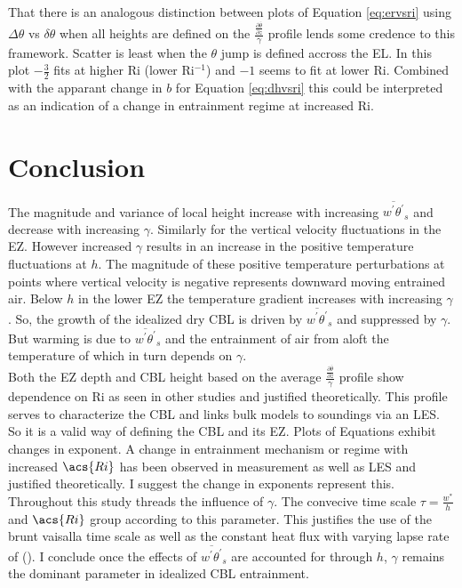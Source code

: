That there is an analogous distinction between plots of Equation \ref{eq:ervsri} using $\Delta \theta$ vs $\delta \theta$ when all heights are defined on the $\frac{\frac{\partial \overline{\theta}}{\partial z}}{\gamma}$ profile lends some credence to this framework.  Scatter is least when the $\theta$ jump is defined accross the \acs{EL}.  In this plot $-\frac{3}{2}$ fits at higher \acs{Ri} (lower \acs{Ri}$^{-1}$) and $-1$ seems to fit at lower \acs{Ri}.  Combined with the apparant change in $b$ for Equation \ref{eq:dhvsri} this could be interpreted as an indication of a change in entrainment regime at increased \acs{Ri}.\\ 

\section{Conclusion}

The magnitude and variance of local height increase with increasing $\overline{w^{'}\theta^{'}}_{s}$ and decrease with increasing $\gamma$.  Similarly for the vertical velocity fluctuations in the \acs{EZ}.  However increased $\gamma$ results in an increase in the positive temperature fluctuations at $h$. The magnitude of these positive temperature perturbations at points where vertical velocity is negative represents downward moving entrained air.  Below $h$ in the lower \acs{EZ} the temperature gradient increases with increasing $\gamma$. So, the growth of the idealized dry \acs{CBL} is driven by $\overline{w^{'}\theta^{'}}_{s}$ and suppressed by $\gamma$. But warming is due to $\overline{w^{'}\theta^{'}}_{s}$ and the entrainment of air from aloft the temperature of which in turn depends on $\gamma$.\\

Both the \acs{EZ} depth and \acs{CBL} height based on the average $\frac{\frac{\partial \overline{\theta}}{\partial z}}{\gamma}$ profile show dependence on \acs{Ri} as seen in other studies and justified theoretically.  This profile serves to characterize the \acs{CBL} and links bulk models to soundings via an \acs{LES}.  So it is a valid way of defining the \acs{CBL} and its \acs{EZ}. Plots of Equations exhibit changes in exponent.  A change in entrainment mechanism or regime with increased $\acs{Ri}$ has been observed in measurement as well as \acs{LES} and justified theoretically. I suggest the change in exponents represent this.\\

Throughout this study threads the influence of $\gamma$.  The convecive time scale $\tau = \frac{w^{*}}{h}$ and $\acs{Ri}$ group according to this parameter.  This justifies  the use of the brunt vaisalla time scale as well as the constant heat flux with varying lapse rate of 
\citeauthor{FedConzMir04} (\citeyear{FedConzMir04}).  I conclude once the effects of $\overline{w^{'}\theta^{'}}_{s}$ are accounted for through $h$, $\gamma$ remains the dominant parameter in idealized \acs{CBL} entrainment.\\ 

\FloatBarrier


\endinput

Any text after an \endinput is ignored.
You could put scraps here or things in progress.
